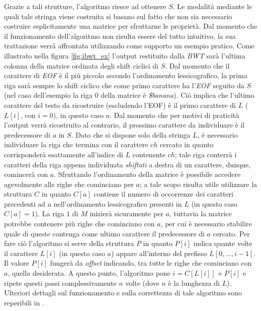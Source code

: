Grazie a tali strutture, l'algoritmo riesce ad ottenere $S$. Le modalità mediante le quali tale stringa viene costruita si basano sul fatto che non sia necessario costruire esplicitamente una matrice per sfruttarne le proprietà. Dal momento che il funzionamento dell'algoritmo non risulta essere del tutto intuitivo, la sua trattazione verrà affrontata utilizzando come supporto un esempio pratico. Come illustrato nella figura \ref{fig:ibwt_ex} l'output restituito dalla \emph{BWT} sarà l'ultima colonna della matrice ordinata degli shift ciclici di $S$. Dal momento che il carattere di \emph{EOF} è il più piccolo secondo l'ordinamento lessicografico, la prima riga sarà sempre lo shift ciclico che come primo carattere ha l'\emph{EOF} seguito da $S$ (nel caso dell'esempio la riga $0$ della matrice è \emph{\$banana}). Ciò implica che l'ultimo carattere del testo da ricostruire (escludendo l'EOF) è il primo carattere di $L$ ($L[i]$, con $i=0$), in questo caso $a$. Dal momento che per motivi di praticità l'output verrà ricostruito al contrario, il prossimo carattere da individuare è il predecessore di $a$ in $S$. Dato che si dispone solo della stringa $L$, è necessario individuare la riga che termina con il carattere $ch$ cercato in quanto corrisponderà esattamente all'indice di $L$ contenente $ch$; tale riga conterrà i caratteri della riga appena individuata \emph{shiftati} a destra di un carattere, dunque, comincerà con $a$. Sfruttando l'ordinamento della matrice è possibile accedere agevolmente alle righe che cominciano per $a$; a tale scopo risulta utile utilizzare la struttura $C$ in quanto $C[a]$ contiene il numero di occorrenze dei caratteri precedenti ad $a$ nell'ordinamento lessicografico presenti in $L$ (in questo caso $C[a]=1$). La riga $1$ di $M$ inizierà sicuramente per $a$, tuttavia la matrice potrebbe contenere più righe che cominciano con $a$, per cui è necessario stabilire quale di queste contenga come ultimo carattere il predecessore di $a$ cercato. Per fare ciò l'algoritmo si serve della struttura $P$ in quanto $P[i]$ indica quante volte il carattere $L[i]$ (in questo caso $a$) appare all'interno del prefisso $L[0,\dots,i-1]$. Il valore $P[i]$ fungerà da \emph{offset} indicando, tra tutte le righe che cominciano con $a$, quella desiderata. A questo punto, l'algoritmo pone $i=C[L[i]]+P[i]$ e ripete questi passi complessivamente $n$ volte (dove $n$ è la lunghezza di $L$). Ulteriori dettagli sul funzionamento e sulla correttezza di tale algoritmo sono reperibili in \cite{burrows1994block}. 
